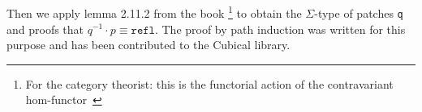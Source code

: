 \begin{code}
\AgdaSymbol{)}\AgdaSpace{}%
\AgdaSpace{}%
\AgdaSymbol{))}\<%
\\
\>[2][@{}l@{\AgdaIndent{0}}]%
\>[4]\AgdaSpace{}%
\AgdaSpace{}%
\AgdaSpace{}%
\AgdaSpace{}%
\AgdaSpace{}%
\AgdaSpace{}%
\AgdaSpace{}%
\AgdaSpace{}%
\AgdaSpace{}%
\AgdaSpace{}%
\AgdaSpace{}%
\AgdaSpace{}%
\AgdaSymbol{)}\AgdaSpace{}%
\AgdaSpace{}%
\AgdaSymbol{)}\AgdaSpace{}%
\<%
\\
%
\>[2]\AgdaSymbol{(}\AgdaFunction{Σ[}\AgdaSpace{}%
\AgdaSpace{}%
\AgdaSpace{}%
\AgdaSpace{}%
\AgdaFunction{]}\AgdaSpace{}%
\AgdaSymbol{(}\AgdaSpace{}%
\AgdaSpace{}%
\AgdaSpace{}%
\AgdaSpace{}%
\AgdaSpace{}%
\AgdaSpace{}%
\AgdaSpace{}%
\AgdaSymbol{)}\AgdaSpace{}%
\AgdaSymbol{)}\AgdaSpace{}%
\AgdaSpace{}%
\AgdaSymbol{)}\<%
\end{code}
Then we apply lemma 2.11.2 from the book
\footnote{For the category theorist: this is the functorial action of the contravariant hom-functor~\cite{hottbook}}
to obtain the $\Sigma$-type of patches \texttt{q} and proofs that $q^{-1} \cdot p \equiv \texttt{refl}$.
The proof by path induction was written for this purpose and has been contributed to the Cubical library.
\begin{code}[hide]%
\>[2][@{}l@{\AgdaIndent{1}}]%
\>[4]\AgdaSpace{}%
\AgdaSpace{}%
\<%
\end{code}
